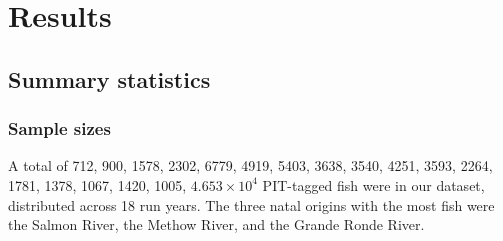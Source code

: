 \documentclass[
  12pt,
]{report}
\begin{document}
\hypertarget{results}{%
\chapter{Results}\label{results}}

\hypertarget{summary-statistics}{%
\section{Summary statistics}\label{summary-statistics}}

\hypertarget{sample-sizes}{%
\subsection{Sample sizes}\label{sample-sizes}}

A total of 712, 900, 1578, 2302, 6779, 4919, 5403, 3638, 3540, 4251,
3593, 2264, 1781, 1378, 1067, 1420, 1005,
\ensuremath{4.653\times 10^{4}} PIT-tagged fish were in our dataset,
distributed across 18 run years. The three natal origins with the most
fish were the Salmon River, the Methow River, and the Grande Ronde
River.

\providecommand{\docline}[3]{\noalign{\global\setlength{\arrayrulewidth}{#1}}\arrayrulecolor[HTML]{#2}\cline{#3}}

\setlength{\tabcolsep}{2pt}

\renewcommand*{\arraystretch}{1.5}
\end{document}
